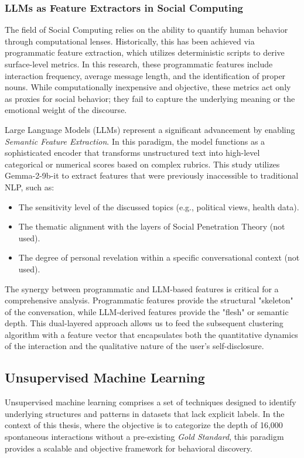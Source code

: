         
        \subsubsection{LLMs as Feature Extractors in Social Computing}

The field of Social Computing relies on the ability to quantify human behavior through computational lenses. Historically, this has been achieved via programmatic feature extraction, which utilizes deterministic scripts to derive surface-level metrics. In this research, these programmatic features include interaction frequency, average message length, and the identification of proper nouns. While computationally inexpensive and objective, these metrics act only as proxies for social behavior; they fail to capture the underlying meaning or the emotional weight of the discourse.

Large Language Models (LLMs) represent a significant advancement by enabling \textit{Semantic Feature Extraction}. In this paradigm, the model functions as a sophisticated encoder that transforms unstructured text into high-level categorical or numerical scores based on complex rubrics. This study utilizes Gemma-2-9b-it to extract features that were previously inaccessible to traditional NLP, such as:

\begin{itemize}
    \item The sensitivity level of the discussed topics (e.g., political views, health data).
    \item The thematic alignment with the layers of Social Penetration Theory (not used).
    \item The degree of personal revelation within a specific conversational context (not used).
\end{itemize}

The synergy between programmatic and LLM-based features is critical for a comprehensive analysis. Programmatic features provide the structural "skeleton" of the conversation, while LLM-derived features provide the "flesh" or semantic depth. This dual-layered approach allows us to feed the subsequent clustering algorithm with a feature vector that encapsulates both the quantitative dynamics of the interaction and the qualitative nature of the user's self-disclosure.
        
    \subsection{Unsupervised Machine Learning}
\label{sec:metrics_label}
Unsupervised machine learning comprises a set of techniques designed to identify underlying structures and patterns in datasets that lack explicit labels. In the context of this thesis, where the objective is to categorize the depth of 16,000 spontaneous interactions without a pre-existing \textit{Gold Standard}, this paradigm provides a scalable and objective framework for behavioral discovery.

